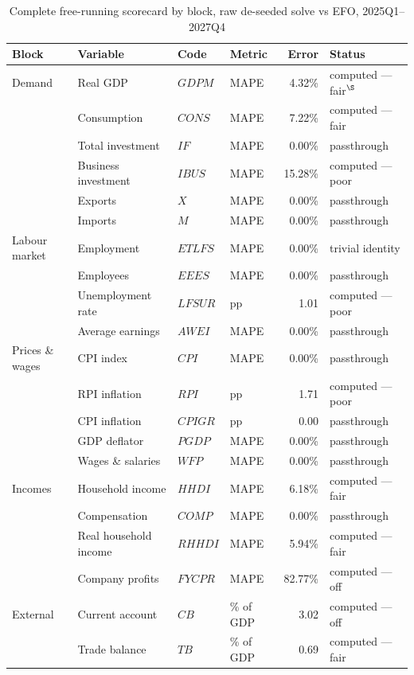 \begin{table}[ht]
\centering
\caption{Complete free-running scorecard by block, raw de-seeded solve vs EFO, 2025Q1--2027Q4}
\label{tab:fullscore}
\small
\begin{tabular}{llllrl}
\toprule
Block & Variable & Code & Metric & Error & Status \\
\midrule
Demand & Real GDP & $GDPM$ & MAPE & 4.32\% & computed --- fair$^{\S}$ \\
 & Consumption & $CONS$ & MAPE & 7.22\% & computed --- fair \\
 & Total investment & $IF$ & MAPE & 0.00\% & passthrough \\
 & Business investment & $IBUS$ & MAPE & 15.28\% & computed --- poor \\
 & Exports & $X$ & MAPE & 0.00\% & passthrough \\
 & Imports & $M$ & MAPE & 0.00\% & passthrough \\
\midrule
Labour market & Employment & $ETLFS$ & MAPE & 0.00\% & trivial identity \\
 & Employees & $EEES$ & MAPE & 0.00\% & passthrough \\
 & Unemployment rate & $LFSUR$ & pp & 1.01 & computed --- poor \\
 & Average earnings & $AWEI$ & MAPE & 0.00\% & passthrough \\
\midrule
Prices \& wages & CPI index & $CPI$ & MAPE & 0.00\% & passthrough \\
 & RPI inflation & $RPI$ & pp & 1.71 & computed --- poor \\
 & CPI inflation & $CPIGR$ & pp & 0.00 & passthrough \\
 & GDP deflator & $PGDP$ & MAPE & 0.00\% & passthrough \\
 & Wages \& salaries & $WFP$ & MAPE & 0.00\% & passthrough \\
\midrule
Incomes & Household income & $HHDI$ & MAPE & 6.18\% & computed --- fair \\
 & Compensation & $COMP$ & MAPE & 0.00\% & passthrough \\
 & Real household income & $RHHDI$ & MAPE & 5.94\% & computed --- fair \\
 & Company profits & $FYCPR$ & MAPE & 82.77\% & computed --- off \\
\midrule
External & Current account & $CB$ & \% of GDP & 3.02 & computed --- off \\
 & Trade balance & $TB$ & \% of GDP & 0.69 & computed --- fair \\
\bottomrule
\end{tabular}


\end{table}
